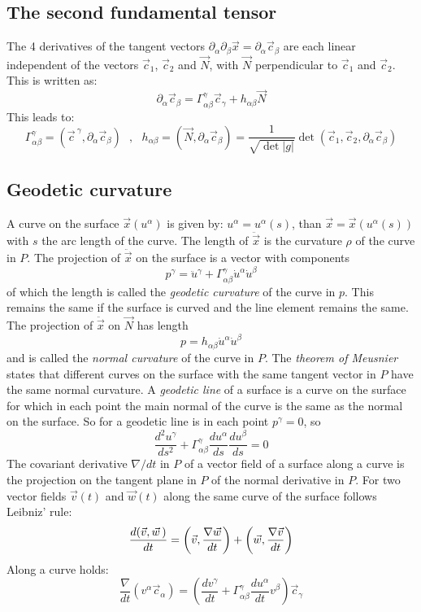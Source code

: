 \documentclass[a4paper,fancyheadings,twoside]{report}
\begin{document}
\subsection{The second fundamental tensor}
The 4 derivatives of the tangent vectors
$\partial_\alpha\partial_\beta\vec{x}=\partial_\alpha\vec{c}_\beta$ are each
linear independent of the vectors $\vec{c}_1$, $\vec{c}_2$ and $\vec{N}$, with
$\vec{N}$ perpendicular to $\vec{c}_1$ and $\vec{c}_2$. This is written as:
\[
\partial_\alpha\vec{c}_\beta=\Gamma^\gamma_{\alpha\beta}\vec{c}_\gamma+h_{\alpha\beta}\vec{N}
\]
This leads to:
\[
\Gamma^\gamma_{\alpha\beta}=(\vec{c}^{~\gamma},\partial_\alpha\vec{c}_\beta)~~~,~~~
h_{\alpha\beta}=(\vec{N},\partial_\alpha\vec{c}_\beta)=\frac{1}{\sqrt{\det|g|}}\det(\vec{c}_1,\vec{c}_2,\partial_\alpha\vec{c}_\beta)
\]

\subsection{Geodetic curvature}
A curve on the surface $\vec{x}(u^\alpha)$ is given by:
$u^\alpha=u^\alpha(s)$, than $\vec{x}=\vec{x}(u^\alpha(s))$ with $s$ the
arc length of the curve. The length of $\ddot{\vec{x}}$ is the curvature
$\rho$ of the curve in $P$. The projection of $\ddot{\vec{x}}$ on the surface
is a vector with components
\[
p^\gamma=\ddot{u}^\gamma+\Gamma^\gamma_{\alpha\beta}\dot{u}^\alpha\dot{u}^\beta
\]
of which the length is called the {\it geodetic curvature} of the curve in $p$.
This remains the same if the surface is curved and the line element remains the
same. The projection of $\ddot{\vec{x}}$ on $\vec{N}$ has length
\[
p=h_{\alpha\beta}\dot{u}^\alpha\dot{u}^\beta
\]
and is called the {\it normal curvature} of the curve in $P$. The {\it theorem
of Meusnier} states that different curves on the surface with the same tangent
vector in $P$ have the same normal curvature.
\npar
A {\it geodetic line} of a surface is a curve on the surface for which in each
point the main normal of the curve is the same as the normal on the surface.
So for a geodetic line is in each point $p^\gamma=0$, so
\[
\frac{d^2u^\gamma}{ds^2}+\Gamma^\gamma_{\alpha\beta}\frac{du^\alpha}{ds}\frac{du^\beta}{ds}=0
\]
The covariant derivative $\nabla/dt$ in $P$ of a vector field of a surface along
a curve is the projection on the tangent plane in $P$ of the normal derivative
in $P$.
\npar
For two vector fields $\vec{v}(t)$ and $\vec{w}(t)$ along the same curve of
the surface follows Leibniz' rule:
\[
\frac{d(\vec{v},\vec{w}\,)}{dt}=\left(\vec{v},\frac{\nabla\vec{w}}{dt}\right)+\left(\vec{w},\frac{\nabla\vec{v}}{dt}\right)
\]
Along a curve holds:
\[
\frac{\nabla}{dt}(v^\alpha\vec{c}_\alpha)=\left(\frac{dv^\gamma}{dt}+\Gamma^\gamma_{\alpha\beta}\frac{du^\alpha}{dt}v^\beta\right)\vec{c}_\gamma
\]
\end{document}
